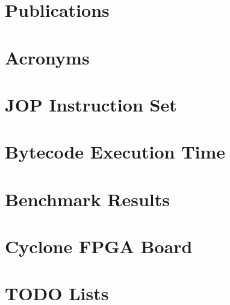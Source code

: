 \appendix
 \ihead{\leftmark} %

\chapter{Publications}
    

\chapter{Acronyms}
 \label{appx:acro}



\chapter{JOP Instruction Set} \label{appx:jop:instr}


\chapter{Bytecode Execution Time} \label{appx:bytecode}


\chapter{Benchmark Results} \label{appx:bench}


\chapter{Cyclone FPGA Board} \label{appx:cycore}


%

\chapter{TODO Lists}




